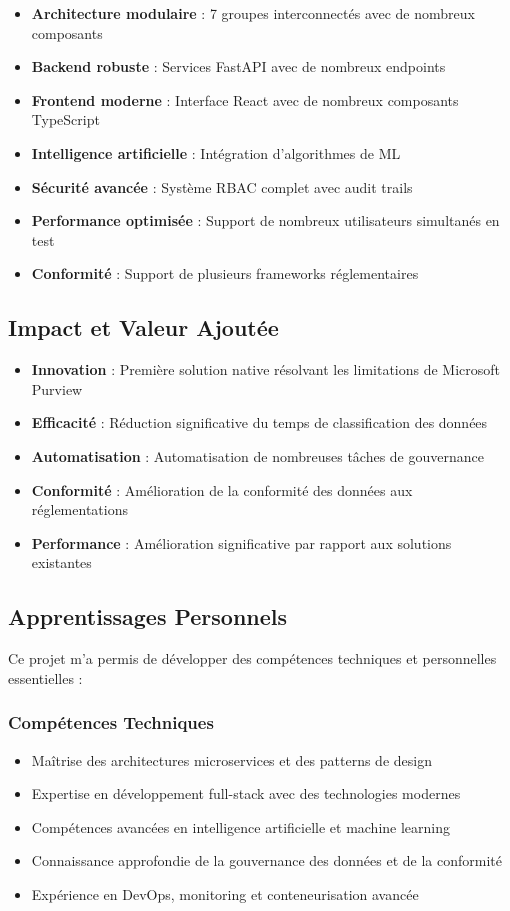 \documentclass[12pt,a4paper]{article}
\begin{document}
\begin{itemize}
    \item \textbf{Architecture modulaire} : 7 groupes interconnectés avec de nombreux composants
    \item \textbf{Backend robuste} : Services FastAPI avec de nombreux endpoints
    \item \textbf{Frontend moderne} : Interface React avec de nombreux composants TypeScript
    \item \textbf{Intelligence artificielle} : Intégration d'algorithmes de ML
    \item \textbf{Sécurité avancée} : Système RBAC complet avec audit trails
    \item \textbf{Performance optimisée} : Support de nombreux utilisateurs simultanés en test
    \item \textbf{Conformité} : Support de plusieurs frameworks réglementaires
\end{itemize}

\subsection{Impact et Valeur Ajoutée}
\begin{itemize}
    \item \textbf{Innovation} : Première solution native résolvant les limitations de Microsoft Purview
    \item \textbf{Efficacité} : Réduction significative du temps de classification des données
    \item \textbf{Automatisation} : Automatisation de nombreuses tâches de gouvernance
    \item \textbf{Conformité} : Amélioration de la conformité des données aux réglementations
    \item \textbf{Performance} : Amélioration significative par rapport aux solutions existantes
\end{itemize}

\subsection{Apprentissages Personnels}
Ce projet m'a permis de développer des compétences techniques et personnelles essentielles :

\subsubsection{Compétences Techniques}
\begin{itemize}
    \item Maîtrise des architectures microservices et des patterns de design
    \item Expertise en développement full-stack avec des technologies modernes
    \item Compétences avancées en intelligence artificielle et machine learning
    \item Connaissance approfondie de la gouvernance des données et de la conformité
    \item Expérience en DevOps, monitoring et conteneurisation avancée
\end{itemize}
\end{document}
